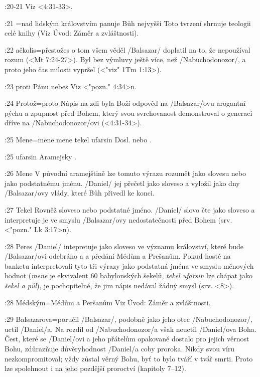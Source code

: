 :20-21 {} Viz  <4:31-33>.     
     
:21 {}={nad lidským královstvím panuje Bůh nejvyšší} Toto tvrzení shrnuje teologii celé knihy (Viz Úvod: Záměr a zvláštnosti).     
     
:22 {ačkolis}={přestožes o tom všem věděl} \x/Balsazar/ doplatil na to, že nepoužíval rozum  (<Mt 7:24-27>). Byl bez výmluvy ještě více, než \x/Nabuchodonozor/, a proto jeho čas milosti vypršel  (<"viz" 1Tm 1:13>).     
\dopsat %
     
:23 {proti Pánu nebes}  Viz <"pozn." 4:34>n.     
     
:24 {Protož}={proto} Nápis na zdi byla Boží odpověď na \x/Balsazar/ovu arogantní pýchu a zpupnost před Bohem, který svou svrchovanost demonstroval o generaci dříve na \x/Nabuchodonozor/ovi  (<4:31-34>).     
     
:25 {Mene}={mene mene tekel ufarsin} Dosl.  nebo . 

:25 {ufarsin} Aramejsky .     

:26 {Mene} V původní aramejštině lze tomuto výrazu rozumět jako slovesu nebo jako podstatnému jménu. \x/Daniel/ jej přečetl jako sloveso  a vyložil jako dny \x/Balsazar/ovy vlády, které Bůh přivedl ke konci.      
     
:27 {Tekel} Rovněž sloveso nebo podstatné jméno. \x/Daniel/ slovo čte  jako sloveso  a interpretuje je ve smyslu \x/Balsazar/ovy nedostatečnosti před Bohem  (srv. <"pozn." Lk 3:17>n).     
     
:28 {Peres} \x/Daniel/ intepretuje jako sloveso  ve významu království, které bude \x/Balsazar/ovi odebráno a a předání Médům a Prešanům. Pokud hosté na banketu interpretovali tyto tři výrazy jako podstatná jména ve smyslu měnových hodnot ({\it mene\/} je ekvivalent 60 babylonských šekelů, {\it tekel ufarsin\/} lze chápat jako {\it šekel a půl\/}),  je pochopitelné, že jim nápis nedával žádný smysl (srv. <8>).   
     
:28 {Médským}={Médům a Peršanům} Viz Úvod: Záměr a zvláštnosti.
     
:29 {Balsazarova}={poručil} \x/Balsazar/, podobně jako jeho otec \x/Nabuchodonozor/, uctil \x/Daniel/a. Na rozdíl od \x/Nabuchodonozor/a však neuctil \x/Daniel/ova Boha. Čest, které se \x/Daniel/ovi a jeho přátelům opakovaně dostalo pro jejich věrnost Bohu,  zdůrazňuje důvěryhodnost \x/Daniel/a coby proroka. Nikdy svou víru nezkompromitoval; vždy zůstal věrný Bohu, byť to bylo  tváří v tvář smrti. Proto lze spolehnout i na jeho pozdější proroctví (kapitoly 7--12). 
     
